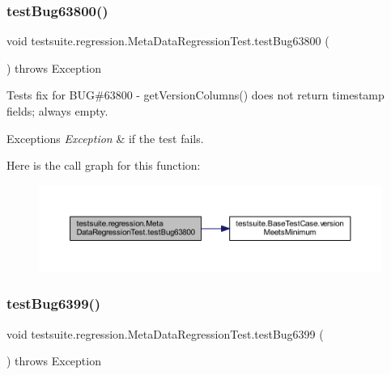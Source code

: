\subsubsection{\texorpdfstring{test\+Bug63800()}{testBug63800()}}
{\footnotesize\ttfamily void testsuite.\+regression.\+Meta\+Data\+Regression\+Test.\+test\+Bug63800 (\begin{DoxyParamCaption}{ }\end{DoxyParamCaption}) throws Exception}

Tests fix for B\+UG\#63800 -\/ get\+Version\+Columns() does not return timestamp fields; always empty.


\begin{DoxyExceptions}{Exceptions}
{\em Exception} & if the test fails. \\
\hline
\end{DoxyExceptions}
Here is the call graph for this function\+:
\nopagebreak
\begin{figure}[H]
\begin{center}
\leavevmode
\includegraphics[width=350pt]{classtestsuite_1_1regression_1_1_meta_data_regression_test_af38b67a5bf6e3396cd891b3f8b4d2c8f_cgraph}
\end{center}
\end{figure}
\mbox{\label{classtestsuite_1_1regression_1_1_meta_data_regression_test_ad90f2153ff1faa28e41a28116ad400ca}} 
\subsubsection{\texorpdfstring{test\+Bug6399()}{testBug6399()}}
{\footnotesize\ttfamily void testsuite.\+regression.\+Meta\+Data\+Regression\+Test.\+test\+Bug6399 (\begin{DoxyParamCaption}{ }\end{DoxyParamCaption}) throws Exception}

